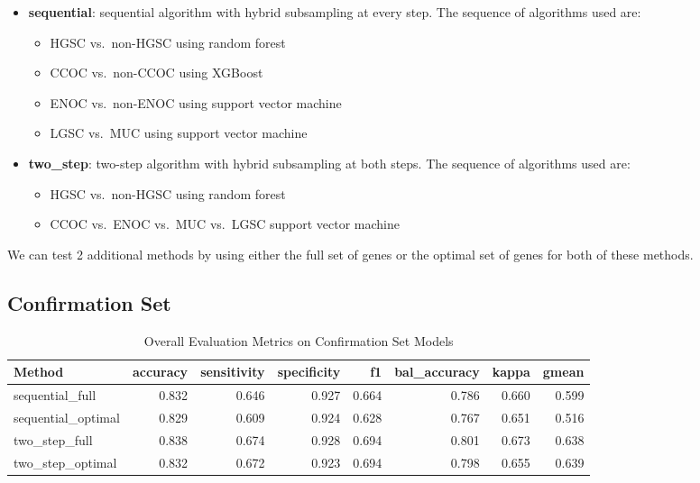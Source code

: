 \documentclass[
]{report}
\providecommand{\tightlist}{%
  \setlength{\itemsep}{0pt}\setlength{\parskip}{0pt}}
\begin{document}
\begin{itemize}
\tightlist
\item
  \textbf{sequential}: sequential algorithm with hybrid subsampling at every step. The sequence of algorithms used are:

  \begin{itemize}
  \tightlist
  \item
    HGSC vs.~non-HGSC using random forest
  \item
    CCOC vs.~non-CCOC using XGBoost
  \item
    ENOC vs.~non-ENOC using support vector machine
  \item
    LGSC vs.~MUC using support vector machine
  \end{itemize}
\item
  \textbf{two\_step}: two-step algorithm with hybrid subsampling at both steps. The sequence of algorithms used are:

  \begin{itemize}
  \tightlist
  \item
    HGSC vs.~non-HGSC using random forest
  \item
    CCOC vs.~ENOC vs.~MUC vs.~LGSC support vector machine
  \end{itemize}
\end{itemize}

We can test 2 additional methods by using either the full set of genes or the optimal set of genes for both of these methods.

\subsection{Confirmation Set}\label{confirmation-set}

\begin{table}

\caption{\label{tab:conf-eval-overall}Overall Evaluation Metrics on Confirmation Set Models}
\centering
\begin{tabular}[t]{l|r|r|r|r|r|r|r}
\hline
Method & accuracy & sensitivity & specificity & f1 & bal\_accuracy & kappa & gmean\\
\hline
sequential\_full & 0.832 & 0.646 & 0.927 & 0.664 & 0.786 & 0.660 & 0.599\\
\hline
sequential\_optimal & 0.829 & 0.609 & 0.924 & 0.628 & 0.767 & 0.651 & 0.516\\
\hline
two\_step\_full & 0.838 & 0.674 & 0.928 & 0.694 & 0.801 & 0.673 & 0.638\\
\hline
two\_step\_optimal & 0.832 & 0.672 & 0.923 & 0.694 & 0.798 & 0.655 & 0.639\\
\hline
\end{tabular}
\end{table}
\end{document}
